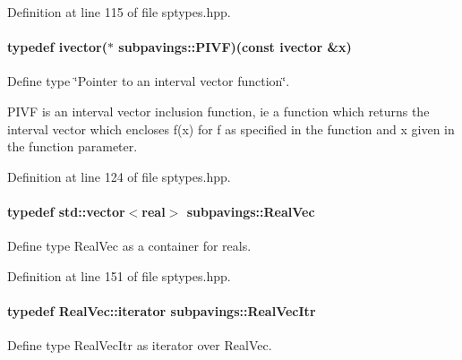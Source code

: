 \-Definition at line 115 of file sptypes.\-hpp.

\hypertarget{namespacesubpavings_af9ec133810ddce70b48381d444e2ec22}{
\paragraph[{\-P\-I\-V\-F}]{\setlength{\rightskip}{0pt plus 5cm}typedef ivector($\ast$ {\bf subpavings\-::\-P\-I\-V\-F})(const ivector \&x)}}\label{namespacesubpavings_af9ec133810ddce70b48381d444e2ec22}


\-Define type \char`\"{}\-Pointer to an interval vector function\char`\"{}. 

\-P\-I\-V\-F is an interval vector inclusion function, ie a function which returns the interval vector which encloses f(x) for f as specified in the function and x given in the function parameter. 

\-Definition at line 124 of file sptypes.\-hpp.

\hypertarget{namespacesubpavings_af2d57bb6e12f4a73169f2e496d6a641f}{
\paragraph[{\-Real\-Vec}]{\setlength{\rightskip}{0pt plus 5cm}typedef std\-::vector$<$real$>$ {\bf subpavings\-::\-Real\-Vec}}}\label{namespacesubpavings_af2d57bb6e12f4a73169f2e496d6a641f}


\-Define type \-Real\-Vec as a container for reals. 



\-Definition at line 151 of file sptypes.\-hpp.

\hypertarget{namespacesubpavings_aca205cec2a67bee00aee408d0cc6f3a1}{
\paragraph[{\-Real\-Vec\-Itr}]{\setlength{\rightskip}{0pt plus 5cm}typedef \-Real\-Vec\-::iterator {\bf subpavings\-::\-Real\-Vec\-Itr}}}\label{namespacesubpavings_aca205cec2a67bee00aee408d0cc6f3a1}


\-Define type \-Real\-Vec\-Itr as iterator over \-Real\-Vec. 



